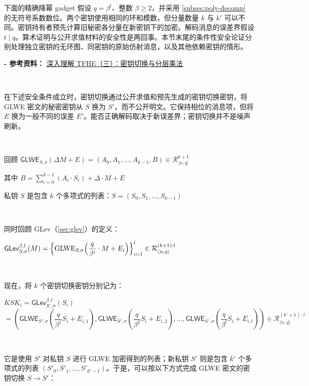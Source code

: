下面的精确降幂 gadget 假设 $q=\beta^l$、整数 $\beta\ge2$，并采用 \autoref{subsec:poly-decomp} 的无符号系数数位。两个密钥使用相同的环和模数，但分量数量 $k$ 与 $k'$ 可以不同。密钥持有者预先计算旧秘密各分量在新密钥下的加密。解码消息的误差界假设 $t\mid q$。算术证明与公开求值材料的安全性是两回事。本节末尾的条件性安全论证分别处理独立密钥的无环图、同密钥的原始仿射消息，以及其他依赖密钥的情形。

\textbf{- 参考资料：}
\href{https://www.zama.ai/post/tfhe-deep-dive-part-3}{深入理解 TFHE（三）：密钥切换与分层乘法}~\cite{tfhe-3}

$ $

在下述安全条件成立时，密钥切换通过公开求值和预先生成的密钥切换密钥，将 GLWE 密文的秘密密钥从 $S$ 换为 $S'$，而不公开明文。它保持相位的消息项，但将 $E$ 换为一般不同的误差 $E'$。能否正确解码取决于新误差界；密钥切换并不是噪声刷新。

$ $

\noindent 回顾 $\textsf{GLWE}_{S,\sigma}(\Delta M + E) = (A_0, A_1, \ldots , A_{k-1}, B) \in \mathcal{R}_{\langle n, q \rangle }^{k + 1}$

其中 $B = \sum\limits_{i=0}^{k-1}{(A_i \cdot S_i)} + \Delta \cdot M + E$

私钥 $S$ 是包含 $k$ 个多项式的列表：$S = (S_0, S_1, \ldots, S_{k-1})$

$ $

\noindent 同时回顾 GLev（\autoref{sec:glev}）的定义：

$\textsf{GLev}_{S, \sigma}^{\beta, l}(M) = \Bigl \{\text{GLWE}_{S, \sigma}\Bigl (\dfrac{q}{\beta^i} \cdot M + E_i \Bigr ) \Bigr \}_{i=1}^{l} \in \mathcal{R}_{\langle n, q \rangle }^{(k+1) \cdot l}$

$ $

\noindent 现在，将 $k$ 个密钥切换密钥分别记为：

$\mathit{KSK}_i = \textsf{GLev}_{S', \sigma}^{\beta, l}(S_i)$ \\
$ = \left ( \textsf{GLWE}_{S', \sigma} \left ( 
 \dfrac{q}{\beta^1}S_i + E_{i, 1}\right ), \textsf{GLWE}_{S', \sigma} \left ( 
 \dfrac{q}{\beta^2}S_i + E_{i, 2}\right ), \ldots, \textsf{GLWE}_{S', \sigma} \left ( 
 \dfrac{q}{\beta^l}S_i  + E_{i, l} \right) \right ) \in \mathcal{R}_{\langle n, q \rangle }^{(k' + 1) \cdot l}$

$ $

\noindent 它是使用 $S'$ 对私钥 $S$ 进行 GLWE 加密得到的列表；新私钥 $S'$ 则是包含 $k'$ 个多项式的列表 $(S'_0, S'_1, \ldots, S'_{k'-1})$。于是，可以按以下方式完成 GLWE 密文的密钥切换 $S \rightarrow S'$：


